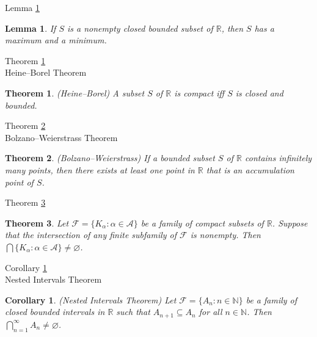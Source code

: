 \documentclass[avery5371,grid]{flashcards}
\newtheorem{lemma}{Lemma}
\newtheorem{corollary}{Corollary}
\newtheorem{theorem}{Theorem}
\newcommand{\bb}[1]{\mathbb{#1}}
\newcommand{\R}{\bb{R}}
\newcommand{\N}{\bb{N}}
\begin{document}
\begin{flashcard}[Lemma]{Lemma \ref{lem01}}
\begin{lemma}
\label{lem01}
If $S$ is a nonempty closed bounded subset of $\R$, then $S$ has a
maximum and a minimum.
\end{lemma}
\end{flashcard}

\begin{flashcard}[Theorem]{Theorem \ref{thm44} \\ Heine--Borel Theorem}
\begin{theorem}
\label{thm44}
(Heine--Borel)  A subset $S$ of $\R$ is compact iff $S$ is closed and
bounded.
\end{theorem}
\end{flashcard}

\begin{flashcard}[Theorem]{Theorem \ref{thm45} \\ Bolzano--Weierstrass
Theorem}
\begin{theorem}
\label{thm45}
(Bolzano--Weierstrass)  If a bounded subset $S$ of $\R$ contains
infinitely many points, then there exists at least one point in $\R$
that is an accumulation point of $S$.
\end{theorem}
\end{flashcard}

\begin{flashcard}[Theorem]{Theorem \ref{thm46}}
\begin{theorem}
\label{thm46}
Let $\mathscr{F} = \{ K_{\alpha} : \alpha \in \mathscr{A} \}$ be a family
of compact subsets of $\R$.  Suppose that the intersection of any finite
subfamily of $\mathscr{F}$ is nonempty.  Then
\mbox{$\bigcap \{ K_{\alpha} : \alpha \in \mathscr{A} \} \neq \varnothing$}.
\end{theorem}
\end{flashcard}

\begin{flashcard}[Corollary]{Corollary \ref{cor02}\\
Nested Intervals Theorem}
\begin{corollary}
\label{cor02}
(Nested Intervals Theorem)  Let $\mathscr{F} = \{ A_{n} : n \in \N \} $
be a family of closed bounded intervals in $\R$ such that $A_{n+1}
\subseteq A_n$ for all $n \in \N$.  Then $\bigcap _{n=1}^{\infty} A_n
\neq \varnothing $.
\end{corollary}
\end{flashcard}
\end{document}
